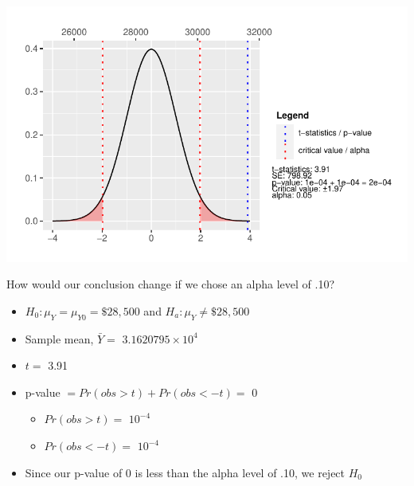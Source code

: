 \documentclass[
  letterpaper,
  DIV=11,
  numbers=noendperiod]{scrartcl}
\newenvironment{Shaded}{\begin{snugshade}}{\end{snugshade}}
\newcommand{\AttributeTok}[1]{\textcolor[rgb]{0.40,0.45,0.13}{#1}}
\newcommand{\DecValTok}[1]{\textcolor[rgb]{0.68,0.00,0.00}{#1}}
\newcommand{\FunctionTok}[1]{\textcolor[rgb]{0.28,0.35,0.67}{#1}}
\newcommand{\NormalTok}[1]{\textcolor[rgb]{0.00,0.23,0.31}{#1}}
\newcommand{\SpecialCharTok}[1]{\textcolor[rgb]{0.37,0.37,0.37}{#1}}
\providecommand{\tightlist}{%
  \setlength{\itemsep}{0pt}\setlength{\parskip}{0pt}}\usepackage{longtable,booktabs,array}
\begin{document}
\begin{Shaded}
\end{Shaded}

\includegraphics{SSS_5.1-Lecture_files/figure-pdf/unnamed-chunk-13-1.pdf}

How would our conclusion change if we chose an alpha level of .10?

\begin{itemize}
\tightlist
\item
  \(H_0: \mu_Y = \mu_{Y0} = \$28,500\) and \(H_a: \mu_Y \ne \$28,500\)
\item
  Sample mean, \(\bar{Y} =\) \ensuremath{3.1620795\times 10^{4}}
\item
  \(t =\) 3.91
\item
  p-value \(= Pr(obs > t) + Pr(obs< -t) =\) 0

  \begin{itemize}
  \tightlist
  \item
    \(Pr(obs>t)=\) \ensuremath{10^{-4}}
  \item
    \(Pr(obs<-t)=\) \ensuremath{10^{-4}}
  \end{itemize}
\item
  Since our p-value of 0 is less than the alpha level of .10, we reject
  \(H_0\)
\end{itemize}

\begin{Shaded}
\end{Shaded}
\end{document}
